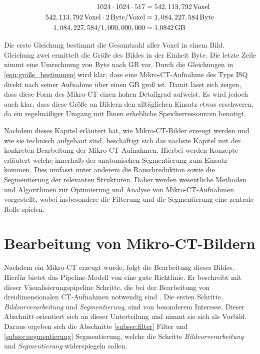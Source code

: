 \begin{align}
	\label{equ:größe_bestimmen}1024 \cdot 1024 \cdot 517    & = 542,113,792 \, \text{Voxel}\notag  \\
	542,113,792 \, \text{Voxel}\cdot 2 \, \text{Byte/Voxel} & = 1,084,227,584 \, \text{Byte}\notag \\
	1,084,227,584 / 1,000,000,000                           & = 1.0842 \, \text{GB}
\end{align}

Die erste Gleichung bestimmt die Gesamtzahl aller Voxel in einem Bild. Gleichung
zwei ermittelt die Größe des Bildes in der Einheit Byte. Die letzte Zeile nimmt eine
Umrechnung von Byte nach \ac{GB} vor. Durch die Gleichungen in \ref{equ:größe_bestimmen}
wird klar, dass eine Mikro-\ac{CT}-Aufnahme des Typs \ac{ISQ} direkt nach seiner
Aufnahme über einen \ac{GB} groß ist. Damit lässt sich zeigen, dass diese Form des
Mikro-\ac{CT} einen hohen Detailgrad aufweist. Es wird jedoch auch klar, dass
diese Größe an Bildern den alltäglichen Einsatz etwas erschweren, da ein regelmäßiger
Umgang mit Ihnen erhebliche Speicherressourcen benötigt.

Nachdem dieses Kapitel erläutert hat, wie Mikro-\ac{CT}-Bilder erzeugt werden und
wie sie technisch aufgebaut sind, beschäftigt sich das nächste Kapitel mit der
konkreten Bearbeitung der Mikro-\ac{CT}-Aufnahmen. Hierbei werden Konzepte
erläutert welche innerhalb der anatomischen Segmentierung zum Einsatz kommen. Dies
umfasst unter anderem die Rauschreduktion sowie die Segmentierung der relevanten
Strukturen. Daher werden wesentliche Methoden und Algorithmen zur Optimierung
und Analyse von Mikro-\ac{CT}-Aufnahmen vorgestellt, wobei insbesondere die
Filterung und die Segmentierung eine zentrale Rolle spielen.

\pagebreak

\section{Bearbeitung von Mikro-CT-Bildern}
\label{sec:bildbearbeitung} Nachdem ein Mikro-\ac{CT} erzeugt wurde, folgt die Bearbeitung
dieses Bildes. Hierfür bietet das Pipeline-Modell von \citet[S.~50]{handels2000}
eine gute Richtlinie. Er beschreibt mit dieser Visualisierungspipeline Schritte,
die bei der Bearbeitung von dreidimensionalen \ac{CT}-Aufnahmen notwendig sind
\citep[vgl.][S.~50]{handels2000}. Die ersten Schritte, \textit{Bildvorverarbeitung}
und \textit{Segmentierung}, sind von besonderem Interesse. Dieser Abschnitt orientiert
sich an dieser Unterteilung und nimmt sie sich als Vorbild. Daraus ergeben sich
die Abschnitte \ref{subsec:filter} Filter und \ref{subsec:segmentierung}
Segmentierung, welche die Schritte \textit{Bildvorverarbeitung} und \textit{Segmentierung}
widerspiegeln sollen.

